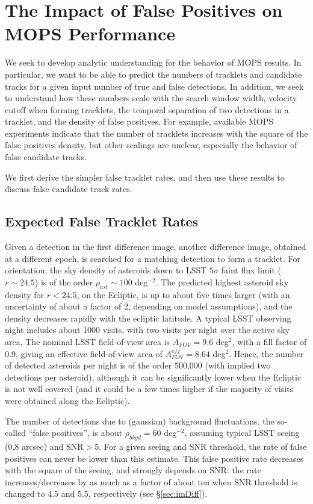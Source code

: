 \section{The Impact of False Positives on MOPS Performance \label{sec:appMOPS}}


We seek to develop analytic understanding for the behavior of MOPS results.
In particular, we want to be able to predict the numbers of tracklets and
candidate tracks for a given input number of true and false detections. In addition, we seek
to understand how these numbers scale with the search window width,
velocity cutoff when forming tracklets, the temporal separation of two
detections in a tracklet, and the density of false positives. For example, available
MOPS experiments indicate that the number of tracklets increases with
the square of the false positives density, but other scalings are unclear,
especially the behavior of false candidate tracks.

We first derive the simpler false tracklet rates, and then use these results to
discuss false candidate track rates.


\subsection{Expected False Tracklet Rates \label{sec:tracklets} }

Given a detection in the first difference image,  another difference image, obtained at a different epoch,
is searched for a matching detection to form a tracklet. For orientation,
the sky density of asteroids down to LSST $5\sigma$ faint flux limit ($r \sim 24.5$) is of the order
$\rho_{ast} \sim 100$ deg$^{-2}$. The predicted highest asteroid sky density for $r<24.5$,
on the Ecliptic, is up to about five times larger (with an uncertainty of about a factor of 2,
depending on model assumptions), and the density decreases rapidly with the ecliptic latitude.
A typical LSST observing night includes about 1000 visits, with two visits per night over
the active sky area. The nominal LSST field-of-view area is $A_{FOV}=9.6$ deg$^2$, with a
fill factor of 0.9, giving an effective field-of-view area of $A_{FOV}^{eff}=8.64$ deg$^2$. Hence,
the number of detected asteroids per night is of the order 500,000 (with implied two detections
per asteroid), although it can be significantly lower when the Ecliptic is not well covered (and
it could be a few times higher if the majority of visits were obtained along the Ecliptic).

The number of detections due to (gaussian) background fluctuations, the so-called ``false
positives'', is about $\rho_{bkgd} = 60$ deg$^{-2}$, assuming typical LSST seeing (0.8 arcsec)
and SNR$>$5. For a given seeing and SNR threshold, the rate of false positives can never be
lower than this estimate. This false positive rate decreases with the square of the seeing, and
strongly depends on SNR: the rate increases/decreases by as much as a factor of about ten
when SNR threshold is changed to 4.5 and 5.5, respectively (see \S\ref{sec:imDiff}).

